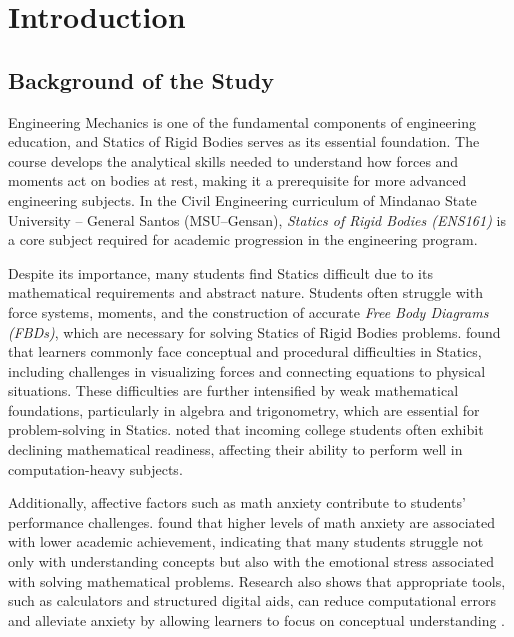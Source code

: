 
\justifying %

\chapter{Introduction}\label{ch:1}

\section{Background of the Study}\label{sec:1-bos}

Engineering Mechanics is one of the fundamental components of engineering education, and Statics of Rigid Bodies serves as its essential foundation. The course develops the analytical skills needed to understand how forces and moments act on bodies at rest, making it a prerequisite for more advanced engineering subjects. In the Civil Engineering curriculum of Mindanao State University -- General Santos (MSU--Gensan), \textit{Statics of Rigid Bodies (ENS161)} is a core subject required for academic progression in the engineering program.

Despite its importance, many students find Statics difficult due to its mathematical requirements and abstract nature. Students often struggle with force systems, moments, and the construction of accurate \textit{Free Body Diagrams (FBDs)}, which are necessary for solving Statics of Rigid Bodies problems. \cite{salami_challenges_2025} found that learners commonly face conceptual and procedural difficulties in Statics, including challenges in visualizing forces and connecting equations to physical situations. These difficulties are further intensified by weak mathematical foundations, particularly in algebra and trigonometry, which are essential for problem-solving in Statics. \cite{felix_analyzing_2023} noted that incoming college students often exhibit declining mathematical readiness, affecting their ability to perform well in computation-heavy subjects.

Additionally, affective factors such as math anxiety contribute to students’ performance challenges. \cite{incierto_mathematics_nodate} found that higher levels of math anxiety are associated with lower academic achievement, indicating that many students struggle not only with understanding concepts but also with the emotional stress associated with solving mathematical problems. Research also shows that appropriate tools, such as calculators and structured digital aids, can reduce computational errors and alleviate anxiety by allowing learners to focus on conceptual understanding \autocite{segarra_does_2024}.

